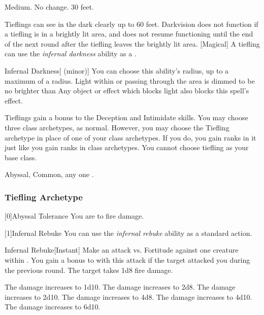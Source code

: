          Medium.
         No change.
         30 feet.
        \begin{itemize}
             Tieflings can see in the dark clearly up to 60 feet. Darkvision does not function if a tiefling is in a brightly lit area, and does not resume functioning until the end of the next round after the tiefling leaves the brightly lit area.
            [Magical] A tiefling can use the \textit{infernal darkness} ability as a .
                \begin{durationability}{Infernal Darkness}[ (minor)]
                    \rankline
                    You can choose this ability's radius, up to a maximum of a \areamed radius.
                    Light within or passing through the area is dimmed to be no brighter than 
                    Any object or effect which blocks light also blocks this spell's effect.
                \end{durationability}
             Tieflings gain a  bonus to the Deception and Intimidate skills.
             You may choose three class archetypes, as normal.
                However, you may choose the Tiefling archetype in place of one of your class archetypes.
                If you do, you gain ranks in it just like you gain ranks in class archetypes.
                You cannot choose tiefling as your base class.
        \end{itemize}
         Abyssal, Common, any one .

        \subsubsection{Tiefling Archetype}
            [0]{Abyssal Tolerance} You are  to fire damage.

            [1]{Infernal Rebuke} You can use the \textit{infernal rebuke} ability as a standard action.
            \begin{freeability}{Infernal Rebuke}[Instant]
                \rankline
                Make an attack vs. Fortitude against one creature within \shortrange.
                You gain a  bonus to  with this attack if the target attacked you during the previous round.
                \hit The target takes 1d8 \add {} fire damage.

                \rankline
                 The damage increases to 1d10.
                 The damage increases to 2d8.
                 The damage increases to 2d10.
                 The damage increases to 4d8.
                 The damage increases to 4d10.
                 The damage increases to 6d10.
            \end{freeability}

